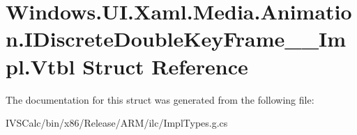 \hypertarget{struct_windows_1_1_u_i_1_1_xaml_1_1_media_1_1_animation_1_1_i_discrete_double_key_frame_____impl_1_1_vtbl}{}\section{Windows.\+U\+I.\+Xaml.\+Media.\+Animation.\+I\+Discrete\+Double\+Key\+Frame\+\_\+\+\_\+\+Impl.\+Vtbl Struct Reference}
\label{struct_windows_1_1_u_i_1_1_xaml_1_1_media_1_1_animation_1_1_i_discrete_double_key_frame_____impl_1_1_vtbl}


The documentation for this struct was generated from the following file\+:\begin{DoxyCompactItemize}
\item 
I\+V\+S\+Calc/bin/x86/\+Release/\+A\+R\+M/ilc/Impl\+Types.\+g.\+cs\end{DoxyCompactItemize}
